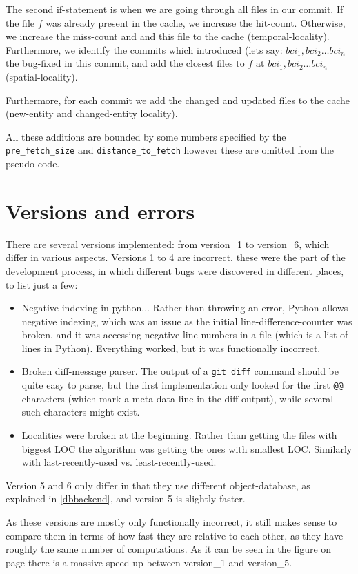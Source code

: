 \documentclass[12pt,twoside,notitlepage]{report}
\begin{document}
The second if-statement is when we are going through all files in our commit. If the file $f$ was already present in the cache, we increase the hit-count. Otherwise, we increase the miss-count and and this file to the cache (temporal-locality). Furthermore, we identify the commits which introduced (lets say: $bci_1, bci_2 \dots bci_n$ the bug-fixed in this commit, and add the closest files to $f$ at $bci_1, bci_2 \dots bci_n$ (spatial-locality).

Furthermore, for each commit we add the changed and updated files to the cache (new-entity and changed-entity locality). 

All these additions are bounded by some numbers specified by the \texttt{pre\_fetch\_size} and \texttt{distance\_to\_fetch} however these are omitted from the pseudo-code.
\section{Versions and errors}
There are several versions implemented: from version\_1 to version\_6, which differ in various aspects. Versions 1 to 4 are incorrect, these were the part of the development process, in which different bugs were discovered in different places, to list just a few:
\begin{itemize}
\item Negative indexing in python... Rather than throwing an error, Python allows negative indexing, which was an issue as the initial line-difference-counter was broken, and it was accessing negative line numbers in a file (which is a list of lines in Python). Everything worked, but it was functionally incorrect.
\clearpage
\item Broken diff-message parser. The output of a \texttt{git diff} command should be quite easy to parse, but the first implementation only looked for the first \texttt{@@} characters (which mark a meta-data line in the diff output), while several such characters might exist.
\item Localities were broken at the beginning. Rather than getting the files with biggest LOC the algorithm was getting the ones with smallest LOC. Similarly with last-recently-used vs. least-recently-used.
\end{itemize}
Version 5 and 6 only differ in that they use different object-database, as explained in \ref{dbbackend}, and version 5 is slightly faster.

As these versions are mostly only functionally incorrect, it still makes sense to compare them in terms of how fast they are relative to each other, as they have roughly the same number of computations. As it can be seen in the figure on page \pageref{fig:speedup} there is a massive speed-up between version\_1 and version\_5.
\end{document}
